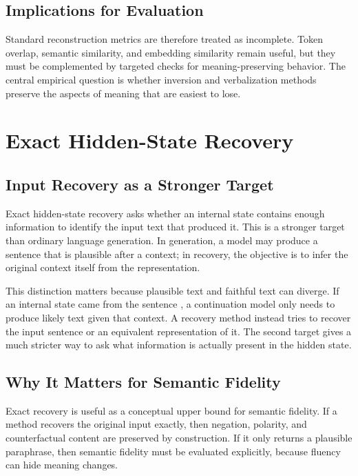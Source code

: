 \documentclass[12pt,a4paper,twoside,openright]{book}
\begin{document}
\subsection{Implications for Evaluation}

Standard reconstruction metrics are therefore treated as incomplete.
Token overlap, semantic similarity, and embedding similarity remain useful, but
they must be complemented by targeted checks for meaning-preserving behavior.
The central empirical question is whether inversion and verbalization methods
preserve the aspects of meaning that are easiest to lose.

\section{Exact Hidden-State Recovery}

\subsection{Input Recovery as a Stronger Target}

Exact hidden-state recovery asks whether an internal state contains enough
information to identify the input text that produced it. This is a stronger
target than ordinary language generation. In generation, a model may produce a
sentence that is plausible after a context; in recovery, the objective is to
infer the original context itself from the representation.

This distinction matters because plausible text and faithful text can diverge.
If an internal state came from the sentence , a continuation model only needs to produce likely text
given that context. A recovery method instead tries to recover the input
sentence or an equivalent representation of it. The second target gives a much
stricter way to ask what information is actually present in the hidden state.

\subsection{Why It Matters for Semantic Fidelity}

Exact recovery is useful as a conceptual upper bound for semantic fidelity. If a
method recovers the original input exactly, then negation, polarity, and
counterfactual content are preserved by construction. If it only returns a
plausible paraphrase, then semantic fidelity must be evaluated explicitly,
because fluency can hide meaning changes.
\end{document}
